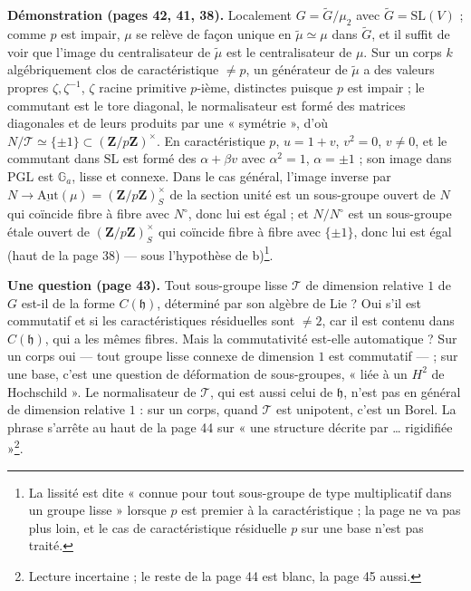 \documentclass[11pt,a4paper]{article}
\begin{document}
\textbf{Démonstration (pages 42, 41, 38).} Localement $G = \widetilde{G}/\mu_2$ avec
$\widetilde{G} = \mathrm{SL}(V)$ ; comme $p$ est impair, $\mu$ se relève de façon
unique en $\widetilde{\mu} \simeq \mu$ dans $\widetilde{G}$, et il suffit de voir que
l'image du centralisateur de $\widetilde{\mu}$ est le centralisateur de $\mu$. Sur un
corps $k$ algébriquement clos de caractéristique $\neq p$, un générateur de
$\widetilde{\mu}$ a des valeurs propres $\zeta, \zeta^{-1}$, $\zeta$ racine primitive
$p$-ième, distinctes puisque $p$ est impair ; le commutant est le tore diagonal,
le normalisateur est formé des matrices diagonales et de leurs produits par une
« symétrie », d'où $N/\mathcal{T} \simeq \{\pm 1\} \subset (\mathbf{Z}/p\mathbf{Z})^{\times}$. En
caractéristique $p$, $u = 1 + v$, $v^2 = 0$, $v \neq 0$, et le commutant dans
$\mathrm{SL}$ est formé des $\alpha + \beta v$ avec $\alpha^2 = 1$, $\alpha = \pm 1$ ;
son image dans $\mathrm{PGL}$ est $\mathbb{G}_a$, lisse et connexe. Dans le cas général,
l'image inverse par $N \to \underline{\mathrm{Aut}}(\mu) = (\mathbf{Z}/p\mathbf{Z})^{\times}_S$ de la
section unité est un sous-groupe ouvert de $N$ qui coïncide fibre à fibre avec
$N^{\circ}$, donc lui est égal ; et $N/N^{\circ}$ est un sous-groupe étale ouvert de
$(\mathbf{Z}/p\mathbf{Z})^{\times}_S$ qui coïncide fibre à fibre avec $\{\pm 1\}$, donc lui est
égal (haut de la page 38) — sous l'hypothèse de b)\footnote{La lissité est dite
« connue pour tout sous-groupe de type multiplicatif dans un groupe lisse »
lorsque $p$ est premier à la caractéristique ; la page ne va pas plus loin, et
le cas de caractéristique résiduelle $p$ sur une base n'est pas traité.}.

\textbf{Une question (page 43).} Tout sous-groupe lisse $\mathcal{T}$ de dimension
relative $1$ de $G$ est-il de la forme $C(\mathfrak{h})$, déterminé par son algèbre de
Lie ? Oui s'il est commutatif et si les caractéristiques résiduelles sont
$\neq 2$, car il est contenu dans $C(\mathfrak{h})$, qui a les mêmes fibres. Mais la
commutativité est-elle automatique ? Sur un corps oui — tout groupe lisse connexe
de dimension $1$ est commutatif — ; sur une base, c'est une question de
déformation de sous-groupes, « liée à un $H^2$ de Hochschild ». Le normalisateur
de $\mathcal{T}$, qui est aussi celui de $\mathfrak{h}$, n'est pas en général de
dimension relative $1$ : sur un corps, quand $\mathcal{T}$ est unipotent, c'est un
Borel. La phrase s'arrête au haut de la page 44 sur « une structure décrite par
\ldots{} rigidifiée »\footnote{Lecture incertaine ; le reste de la page 44 est
blanc, la page 45 aussi.}.
\end{document}

